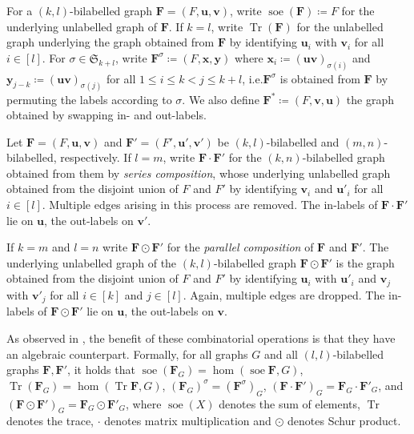 \documentclass[11pt,a4paper]{article}
\theoremstyle{plain}
\theoremstyle{remark}
\theoremstyle{definition}
\DeclareMathOperator{\tr}{Tr}
\DeclareMathOperator{\soe}{soe}
\begin{document}
For a $(k, l)$-bilabelled graph $\boldsymbol{F} = (F, \boldsymbol{u}, \boldsymbol{v})$, write $\soe(\boldsymbol{F}) \coloneqq F$ for the underlying unlabelled graph of $\boldsymbol{F}$. 
If $k = l$, write $\tr(\boldsymbol{F})$ for the unlabelled graph underlying the graph obtained from $\boldsymbol{F}$ by identifying $\boldsymbol{u}_i$ with $\boldsymbol{v}_i$ for all $i\in [l]$.
For $\sigma \in \mathfrak{S}_{k+l}$, write $\boldsymbol{F}^\sigma \coloneqq (F, \boldsymbol{x}, \boldsymbol{y})$ where $\boldsymbol{x}_i \coloneqq (\boldsymbol{uv})_{\sigma(i)}$ and  $\boldsymbol{y}_{j-k} \coloneqq (\boldsymbol{uv})_{\sigma(j)}$ for all $1 \leq i \leq k < j \leq k+l$, i.e.\@ $\boldsymbol{F}^\sigma$ is obtained from $\boldsymbol{F}$ by permuting the labels according to $\sigma$.
We also define $\boldsymbol{F}^* \coloneqq (F, \boldsymbol{v}, \boldsymbol{u})$ the graph obtained by swapping in- and out-labels. 

Let $\boldsymbol{F} = (F, \boldsymbol{u}, \boldsymbol{v})$ and $\boldsymbol{F}' = (F', \boldsymbol{u}', \boldsymbol{v}')$ be $(k,l)$-bilabelled and $(m,n)$-bilabelled, respectively.
If $l = m$, write $\boldsymbol{F} \cdot \boldsymbol{F}'$ for the $(k, n)$-bilabelled graph obtained from them by \emph{series composition}, whose underlying unlabelled graph obtained from the disjoint union of $F$ and $F'$ by identifying $\boldsymbol{v}_i$ and $\boldsymbol{u}'_i$ for all $i \in [l]$. 
Multiple edges arising in this process are removed. 
The in-labels of $\boldsymbol{F} \cdot \boldsymbol{F}'$ lie on $\boldsymbol{u}$, the out-labels on $\boldsymbol{v}'$.


If $k = m$ and $l = n$ write $\boldsymbol{F} \odot \boldsymbol{F}'$ for the \emph{parallel composition} of $\boldsymbol{F}$ and $\boldsymbol{F}'$. 
The underlying unlabelled graph of the $(k, l)$-bilabelled graph $\boldsymbol{F} \odot \boldsymbol{F}'$ is the graph obtained from the disjoint union of $F$ and $F'$ by identifying $\boldsymbol{u}_i$ with $\boldsymbol{u}'_i$ and $\boldsymbol{v}_j$ with $\boldsymbol{v}'_j$  for all $i \in [k]$ and $j \in [l]$. 
Again, multiple edges are dropped. The in-labels of $\boldsymbol{F} \odot \boldsymbol{F}'$ lie on $\boldsymbol{u}$, the out-labels on $\boldsymbol{v}$.
    
As observed in \cite{david-laura,grohe_homomorphism_2022}, the benefit of these combinatorial operations is that they have an algebraic counterpart. Formally, for all graphs $G$ and all $(l, l)$-bilabelled graphs $\boldsymbol{F}, \boldsymbol{F}'$, it holds that $\soe(\boldsymbol{F}_G) = \hom(\soe \boldsymbol{F}, G) $, $\tr(\boldsymbol{F}_G) = \hom(\tr \boldsymbol{F}, G)$, $(\boldsymbol{F}_G)^\sigma = (\boldsymbol{F}^\sigma)_G$, $(\boldsymbol{F} \cdot \boldsymbol{F}')_G = \boldsymbol{F}_G \cdot \boldsymbol{F}'_G$, and $(\boldsymbol{F} \odot \boldsymbol{F}')_G = \boldsymbol{F}_G \odot \boldsymbol{F}'_G$, where $\soe(X)$ denotes the sum of elements, $\tr$ denotes the trace, $\cdot$ denotes matrix multiplication and $\odot$ denotes Schur product.  
\end{document}
